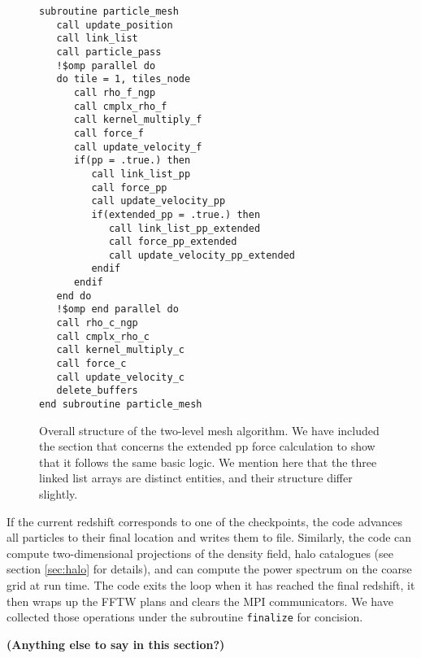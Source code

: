 \begin{figure}
\begin{verbatim}
subroutine particle_mesh
   call update_position
   call link_list
   call particle_pass
   !$omp parallel do
   do tile = 1, tiles_node
      call rho_f_ngp
      call cmplx_rho_f
      call kernel_multiply_f
      call force_f
      call update_velocity_f
      if(pp = .true.) then       
         call link_list_pp
         call force_pp
         call update_velocity_pp
         if(extended_pp = .true.) then
            call link_list_pp_extended
            call force_pp_extended
            call update_velocity_pp_extended       
         endif
      endif
   end do
   !$omp end parallel do
   call rho_c_ngp
   call cmplx_rho_c
   call kernel_multiply_c
   call force_c
   call update_velocity_c      
   delete_buffers
end subroutine particle_mesh
\end{verbatim}
\caption{Overall structure of the two-level mesh algorithm. We have included the section that concerns the extended pp force calculation to show that it follows the same basic logic. We mention here that the three linked list arrays are distinct entities, and their structure differ slightly.  }
\label{fig:particle_mesh}
\end{figure}


If the current redshift corresponds to one of the checkpoints, the code advances all particles to their final location
and writes them to file. Similarly, the code can compute two-dimensional projections of the density field, halo catalogues (see section \ref{sec:halo} for details), and can compute the power spectrum on the coarse grid at run time. 
The code exits the loop when it has reached the final redshift, it then wraps up the {\small FFTW} plans 
and clears the {\small MPI} communicators. We have collected those operations under the subroutine {\tt finalize} for concision.




{\bf (Anything else to say in this section?)}
